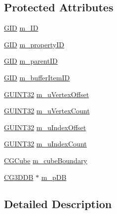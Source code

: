 \subsection*{Protected Attributes}
\begin{DoxyCompactItemize}
\item 
\hyperlink{_g_types_8h_a5b96ecb16d8e437977d12cd40aa6f6d8}{G\+I\+D} \hyperlink{class_c_g_object_base_aeac152b8ebc691aa991ea0aaf0161c56}{m\+\_\+\+I\+D}
\item 
\hyperlink{_g_types_8h_a5b96ecb16d8e437977d12cd40aa6f6d8}{G\+I\+D} \hyperlink{class_c_g_object_base_a8898995e9dfd9534e3d07a5c92a08d27}{m\+\_\+property\+I\+D}
\item 
\hyperlink{_g_types_8h_a5b96ecb16d8e437977d12cd40aa6f6d8}{G\+I\+D} \hyperlink{class_c_g_object_base_a0d6b8e70a0b189dbc45338584d33797e}{m\+\_\+parent\+I\+D}
\item 
\hyperlink{_g_types_8h_a5b96ecb16d8e437977d12cd40aa6f6d8}{G\+I\+D} \hyperlink{class_c_g_object_base_ae740b1951809209b0e0fe1d4060fbbb7}{m\+\_\+buffer\+Item\+I\+D}
\item 
\hyperlink{_g_types_8h_a2e1a1c77d1349057202e2f34e071019c}{G\+U\+I\+N\+T32} \hyperlink{class_c_g_object_base_ad4d1be94d2905d252600c22af13707ea}{m\+\_\+u\+Vertex\+Offset}
\item 
\hyperlink{_g_types_8h_a2e1a1c77d1349057202e2f34e071019c}{G\+U\+I\+N\+T32} \hyperlink{class_c_g_object_base_a61308d916484b4580b648e8bcd5bf1fe}{m\+\_\+u\+Vertex\+Count}
\item 
\hyperlink{_g_types_8h_a2e1a1c77d1349057202e2f34e071019c}{G\+U\+I\+N\+T32} \hyperlink{class_c_g_object_base_a013a809eaf95f6c7f8fe706d8759709c}{m\+\_\+u\+Index\+Offset}
\item 
\hyperlink{_g_types_8h_a2e1a1c77d1349057202e2f34e071019c}{G\+U\+I\+N\+T32} \hyperlink{class_c_g_object_base_aa2e76d4ebb7f7596ae3d0ce94d7070b9}{m\+\_\+u\+Index\+Count}
\item 
\hyperlink{class_c_g_cube}{C\+G\+Cube} \hyperlink{class_c_g_object_base_abb41a799cc61aad31c2aafa2e2ea86c4}{m\+\_\+cube\+Boundary}
\item 
\hyperlink{class_c_g3_d_d_b}{C\+G3\+D\+D\+B} $\ast$ \hyperlink{class_c_g_object_base_a0c5078583791d9b0dcf6a3799243b1c5}{m\+\_\+p\+D\+B}
\end{DoxyCompactItemize}


\subsection{Detailed Description}

